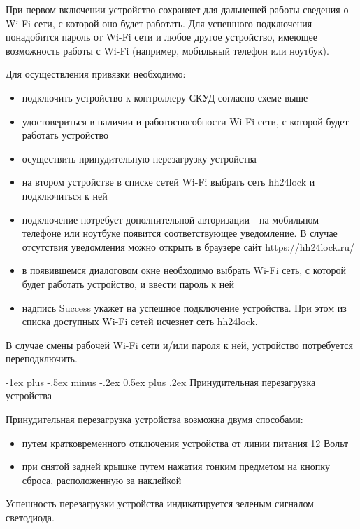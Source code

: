 \documentclass[a4paper,10pt,landscape]{article}
\makeatletter
\renewcommand{\section}{\@startsection{section}{1}{0mm}%
                                {-1ex plus -.5ex minus -.2ex}%
                                {0.5ex plus .2ex}%
                                {\normalfont\large\bfseries}}
\makeatother
\begin{document}
\begin{multicols}{3}
При первом включении устройство сохраняет для дальнешей работы сведения о Wi-Fi сети, с которой оно будет работать. Для успешного подключения понадобится пароль от Wi-Fi сети и любое другое устройство, имеющее возможность работы с Wi-Fi (например, мобильный телефон или ноутбук).

Для осуществления привязки необходимо:

\begin{itemize}
  \item подключить устройство к контроллеру СКУД согласно схеме выше 
  \item удостовериться в наличии и работоспособности Wi-Fi сети, с которой будет работать устройство
  \item осуществить принудительную перезагрузку устройства 
  \item на втором устройстве в списке сетей Wi-Fi выбрать сеть hh24lock и подключиться к ней
  \item подключение потребует дополнительной авторизации - на мобильном телефоне или ноутбуке появится соответствующее уведомление. В случае отсутствия уведомления можно открыть в браузере сайт https://hh24lock.ru/ 
  \item в появившемся диалоговом окне необходимо выбрать Wi-Fi сеть, с которой будет работать устройство, и ввести пароль к ней
  \item надпись Success укажет на успешное подключение устройства. При этом из списка доступных Wi-Fi сетей исчезнет сеть hh24lock.
\end{itemize}


В случае смены рабочей Wi-Fi сети и/или пароля к ней, устройство потребуется переподключить. 

\section{Принудительная перезагрузка устройства}

Принудительная перезагрузка устройства возможна двумя способами:  

\begin{itemize} 
  \item путем кратковременного отключения устройства от линии питания 12 Вольт
  \item при снятой задней крышке путем нажатия тонким предметом на кнопку сброса, расположенную за наклейкой
\end{itemize}

Успешность перезагрузки устройства индикатируется зеленым сигналом светодиода. 


\end{multicols}
\end{document}
